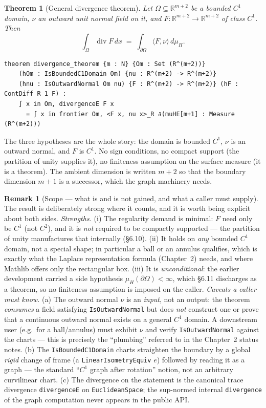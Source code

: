 ﻿\documentclass[12pt, a4paper]{article}
\renewcommand{\_}{\origunderscore\allowbreak}
\theoremstyle{definition}
\newtheorem{remark}{Remark}[section]
\theoremstyle{plain}
\newtheorem{theorem}{Theorem}[section]
\begin{document}
\begin{theorem}[General divergence theorem]
Let $\Omega\subseteq\mathbb{R}^{m+2}$ be a bounded $C^1$ domain, $\nu$ an outward unit normal
field on it, and $F:\mathbb{R}^{m+2}\to\mathbb{R}^{m+2}$ of class $C^1$.  Then
\[
  \int_{\Omega}\operatorname{div}F\,dx \;=\; \int_{\partial\Omega}\langle F,\nu\rangle\,d\mu_H .
\]
\end{theorem}

\begin{lstlisting}[caption={The capstone (unconditional, sorry-free)}]
theorem divergence_theorem {m : N} {Om : Set (R^(m+2))}
    (hOm : IsBoundedC1Domain Om) {nu : R^(m+2) -> R^(m+2)}
    (hnu : IsOutwardNormal Om nu) {F : R^(m+2) -> R^(m+2)} (hF : ContDiff R 1 F) :
    ∫ x in Om, divergenceE F x
      = ∫ x in frontier Om, <F x, nu x>_R ∂(muHE[m+1] : Measure (R^(m+2)))
\end{lstlisting}

The three hypotheses are the whole story: the domain is bounded $C^1$, $\nu$ is an outward normal,
and $F$ is $C^1$.  No sign conditions, no compact support (the partition of unity supplies it), no
finiteness assumption on the surface measure (it is a theorem).  The ambient dimension is written
$m+2$ so that the boundary dimension $m+1$ is a successor, which the graph machinery needs.

\begin{remark}[Scope --- what is and is not gained, and what a caller must supply]
The result is deliberately strong where it counts, and it is worth being explicit about both sides.
\emph{Strengths.} (i) The regularity demand is minimal: $F$ need only be $C^1$ (not $C^2$), and it
is \emph{not} required to be compactly supported --- the partition of unity manufactures that
internally (\S6.10). (ii) It holds on \emph{any} bounded $C^1$ domain, not a special shape; in
particular a ball or an annulus qualifies, which is exactly what the Laplace representation formula
(Chapter~2) needs, and where Mathlib offers only the rectangular box. (iii) It is
\emph{unconditional}: the earlier development carried a side hypothesis $\mu_H(\partial\Omega)<\infty$,
which \S6.11 discharges as a theorem, so no finiteness assumption is imposed on the caller.
\emph{Caveats a caller must know.} (a) The outward normal $\nu$ is an \emph{input}, not an output:
the theorem \emph{consumes} a field satisfying \texttt{IsOutwardNormal} but does \emph{not} construct
one or prove that a continuous outward normal exists on a general $C^1$ domain. A downstream user
(e.g.\ for a ball/annulus) must exhibit $\nu$ and verify \texttt{IsOutwardNormal} against the charts
--- this is precisely the ``plumbing'' referred to in the Chapter~2 status notes. (b) The
\texttt{IsBoundedC1Domain} charts straighten the boundary by a global \emph{rigid} change of frame
(a \texttt{LinearIsometryEquiv} $e$) followed by reading it as a graph --- the standard ``$C^1$
graph after rotation'' notion, not an arbitrary curvilinear chart. (c) The divergence on the
statement is the canonical trace divergence \texttt{divergenceE} on \texttt{EuclideanSpace}; the
sup-normed internal \texttt{divergence} of the graph computation never appears in the public API.
\end{remark}
\end{document}
